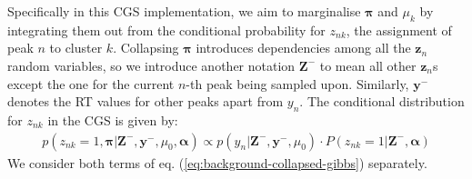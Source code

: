 Specifically in this CGS implementation, we aim to marginalise $\boldsymbol{\pi}$ and $\mu_k$ by integrating them out from the conditional probability for $z_{nk}$, the assignment of peak $n$ to cluster $k$. Collapsing $\boldsymbol{\pi}$ introduces dependencies among all the $\boldsymbol{z}_n$ random variables, so we introduce another notation $\boldsymbol{Z}^{-}$ to mean all other $\boldsymbol{z}_n$s except the one for the current $n$-th peak being sampled upon. Similarly, $\boldsymbol{y}^{-}$ denotes the RT values for other peaks apart from $y_n$. The conditional distribution for $z_{nk}$ in the CGS is given by:
\begin{equation}
\begin{aligned}
p(z_{nk}=1, \boldsymbol{\pi} \vert \boldsymbol{Z}^{-}, \boldsymbol{y}^-, \mu_0, \boldsymbol{\alpha}) \propto p(y_n \vert \boldsymbol{Z}^{-},  \boldsymbol{y}^{-}, \mu_0) \cdot P(z_{nk}=1 \vert \boldsymbol{Z}^{-}, \boldsymbol{\alpha})
\end{aligned}
\label{eq:background-collapsed-gibbs}
\end{equation}
We consider both terms of eq. (\ref{eq:background-collapsed-gibbs}) separately. 
